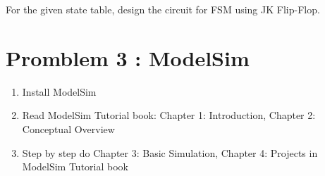 \documentclass[12pt, letterpaper]{article}
\begin{document}
For the given state table, design the circuit for FSM using JK Flip-Flop.

\pagebreak
\section*{Promblem 3 : ModelSim}

\begin{enumerate}
    \item Install ModelSim
    \item Read ModelSim Tutorial book: Chapter 1: Introduction, Chapter 2: Conceptual Overview
    \item Step by step do Chapter 3: Basic Simulation, Chapter 4: Projects in ModelSim Tutorial book
\end{enumerate}
\end{document}
